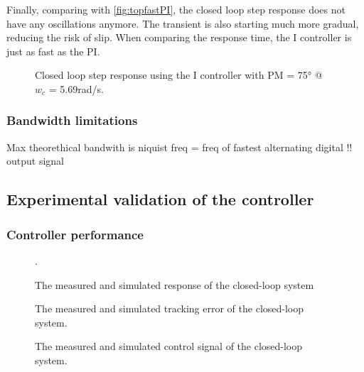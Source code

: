 \documentclass[a4paper]{article}
\newcommand{\newpar}{\vspace{.3cm}\noindent}
\begin{document}
\newpar
Finally, comparing with \autoref{fig:topfastPI}, the closed loop step response does not have any oscillations anymore. The transient is also starting much more gradual, reducing the risk of slip. When comparing the response time, the I controller is just as fast as the PI.

\begin{figure}[H]
    \caption{Closed loop step response using the I controller with PM = 75° @ $w_{c}$ = 5.69rad/s.}
    \label{fig:2_closedloopbode}
\end{figure}


\subsubsection{Bandwidth limitations}
Max theorethical bandwith is niquist freq = freq of fastest alternating digital !! output signal 


\subsection{Experimental validation of the controller}
\subsubsection{Controller performance}

\begin{figure}[H]
    \caption{The measured and simulated response of the closed-loop system}.
    \label{fig:closed_loop_response}
\end{figure}

\begin{figure}[H]
    \caption{The measured and simulated tracking error of the closed-loop system.}
    \label{fig:tracking_error}
\end{figure}

\begin{figure}[H]
    \caption{The measured and simulated control signal of the closed-loop system.}
    \label{fig:control_signal}
\end{figure}
\end{document}

